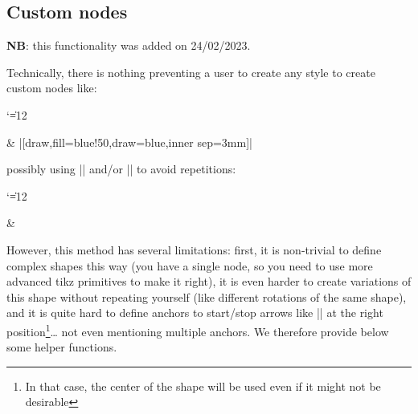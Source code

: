 \documentclass[a4paper,doc2]{ltxdoc} %
\begin{document}
{\subsection{Custom nodes}\label{subsec:customNodes}

\textbf{NB}: this functionality was added on 24/02/2023.

Technically, there is nothing preventing a user to create any style to create custom nodes like:
{\catcode`\|=12 %
\begin{codeexample}[width=0pt]
  \begin{ZX}
    \zxN{} \rar & |[draw,fill=blue!50,draw=blue,inner sep=3mm]| 
  \end{ZX}
\end{codeexample}
}
possibly using |\tikzset| and/or |\NewExpandableDocumentCommand| to avoid repetitions:
{\catcode`\|=12 %
\begin{codeexample}[width=0pt]
  \begin{ZX}
    \zxN{} \rar & 
  \end{ZX}
\end{codeexample}
}
However, this method has several limitations: first, it is non-trivial to define complex shapes this way (you have a single node, so you need to use more advanced tikz primitives to make it right), it is even harder to create variations of this shape without repeating yourself (like different rotations of the same shape), and it is quite hard to define anchors to start/stop arrows like |\rar[<']| at the right position\footnote{In that case, the center of the shape will be used even if it might not be desirable}… not even mentioning multiple anchors. We therefore provide below some helper functions.

}
\end{document}
